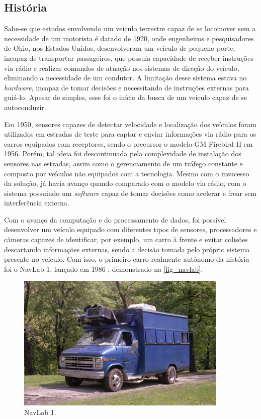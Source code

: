 \subsection{Hist{\'o}ria}

Sabe-se que estudos envolvendo um veículo terrestre capaz de se locomover sem a
necessidade de um motorista é datado de 1920, onde engenheiros e pesquisadores
de Ohio, nos Estados Unidos, desenvolveram um veículo de pequeno porte, incapaz
de transportar passageiros, que possuía capacidade de receber instruções via
rádio e realizar comandos de atuação nos sistemas de direção do veículo,
eliminando a necessidade de um condutor.  A limitação desse sistema estava no
\textit{hardware}, incapaz de tomar decisões e necessitando de instruções externas para
guiá-lo. Apesar de simples, esse foi o início da busca de um veículo capaz de
se autoconduzir. 

Em 1950, sensores capazes de detectar velocidade e localização dos veículos
foram utilizados em estradas de teste para captar e enviar informações via
rádio para os carros equipados com receptores, sendo o precursor o modelo GM
Firebird II em 1956. Porém, tal ideia foi descontinuada pela complexidade de
instalação dos sensores nas estradas, assim como o gerenciamento de um tráfego
constante e composto por veículos não equipados com a tecnologia. Mesmo com o
insucesso da solução, já havia avanço quando comparado com o modelo via rádio,
com o sistema possuindo um \textit{software} capaz de tomar decisões como acelerar e
frear sem interferência externa.

Com o avanço da computação e do processamento de dados, foi possível
desenvolver um veículo equipado com diferentes tipos de sensores, processadores
e câmeras capazes de identificar, por exemplo, um carro à frente e evitar
colisões descartando informações externas, sendo a decisão tomada pelo próprio
sistema presente no veículo. Com isso, o primeiro carro realmente autônomo da
história foi o NavLab 1, lançado em 1986 \cite{estadao2020}, demonstrado na \autoref{fig_navlab}. 

\begin{figure}[htb]
        \centering
        \caption{\label{fig_navlab}NavLab 1.}
        \includegraphics[width=0.9\textwidth]{images/EG-navlab1-CMU-media-relations.jpg}
\end{figure}

